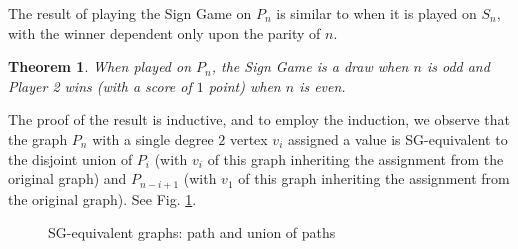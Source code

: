 \documentclass[amsart,11pt]{article}
\theoremstyle{dotless}
\theoremstyle{dotless}
\newtheorem{thm}{Theorem}[section]
\begin{document}
The result of playing the Sign Game on $P_n$ is similar to when it is played on $S_n$, with the winner dependent only upon the parity of $n$. 

\begin{thm} \label{thm3}
When played on $P_n$, the Sign Game is a draw when $n$ is odd and Player 2 wins (with a score of $1$ point) when $n$ is even.
\end{thm}

The proof of the result is inductive, and to employ the induction, we observe that the graph $P_n$ with a single degree $2$ vertex $v_i$ assigned a value is SG-equivalent to the disjoint union of $P_{i}$ (with $v_i$ of this graph inheriting the assignment from the original graph) and $P_{n-i+1}$ (with $v_1$ of this graph inheriting the assignment from the original graph). See Fig. \ref{figpathSG}. 

\begin{figure}[htb]  
\centering  

\hspace{50pt}

\caption{SG-equivalent graphs: path and union of paths}
\label{figpathSG}
\end{figure}
\end{document}
